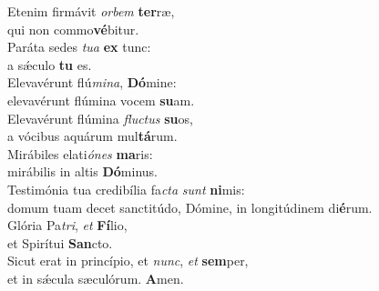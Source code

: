 \evenverse Etenim firmávit \textit{or}\textit{bem} \textbf{ter}ræ,~\*\\
\evenverse qui non commo\textbf{vé}bitur.\\
\oddverse Paráta sedes \textit{tu}\textit{a} \textbf{ex} tunc:~\*\\
\oddverse a sǽculo \textbf{tu} es.\\
\evenverse Elevavérunt flú\textit{mi}\textit{na}, \textbf{Dó}mine:~\*\\
\evenverse elevavérunt flúmina vocem \textbf{su}am.\\
\oddverse Elevavérunt flúmina \textit{flu}\textit{ctus} \textbf{su}os,~\*\\
\oddverse a vócibus aquárum mul\textbf{tá}rum.\\
\evenverse Mirábiles elati\textit{ó}\textit{nes} \textbf{ma}ris:~\*\\
\evenverse mirábilis in altis \textbf{Dó}minus.\\
\oddverse Testimónia tua credibília fa\textit{cta} \textit{sunt} \textbf{ni}mis:~\*\\
\oddverse domum tuam decet sanctitúdo, Dómine, in longitúdinem di\textbf{é}rum.\\
\evenverse Glória Pa\textit{tri}, \textit{et} \textbf{Fí}lio,~\*\\
\evenverse et Spirítui \textbf{San}cto.\\
\oddverse Sicut erat in princípio, et \textit{nunc}, \textit{et} \textbf{sem}per,~\*\\
\oddverse et in sǽcula sæculórum. \textbf{A}men.\\
